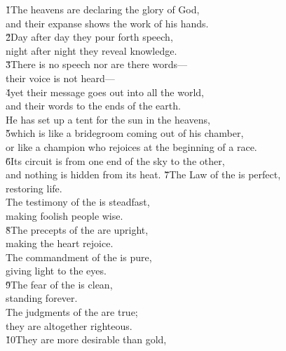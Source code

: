 \begin{poetry}
\poeml \v{1}The heavens are declaring the glory of God, \\
\poemll    and their expanse shows the work of his hands. \\
\poeml \v{2}Day after day they pour forth speech, \\
\poemll    night after night they reveal knowledge. \\
\poeml \v{3}There is no speech nor are there words--- \\
\poemll    their voice is not heard--- \\
\poeml \v{4}yet their message goes out into all the world, \\
\poemll    and their words to the ends of the earth. \\
\poeml He has set up a tent for the sun in the heavens, \\
\poeml \v{5}which is like a bridegroom coming out of his chamber, \\
\poemlll       or like a champion who rejoices at the beginning of a race. \\
\poeml \v{6}Its circuit is from one end of the sky to the other, \\
\poemll    and nothing is hidden from its heat.
\poeml \v{7}The Law of the  is perfect, \\
\poemll    restoring life. \\
\poeml The testimony of the  is steadfast, \\
\poemll    making foolish people wise. \\
\poeml \v{8}The precepts of the  are upright, \\
\poemll    making the heart rejoice. \\
\poeml The commandment of the  is pure, \\
\poemll    giving light to the eyes. \\
\poeml \v{9}The fear of the  is clean, \\
\poemll    standing forever. \\
\poeml The judgments of the  are true; \\
\poemll    they are altogether righteous. \\
\poeml \v{10}They are more desirable than gold, \\

\end{poetry}
